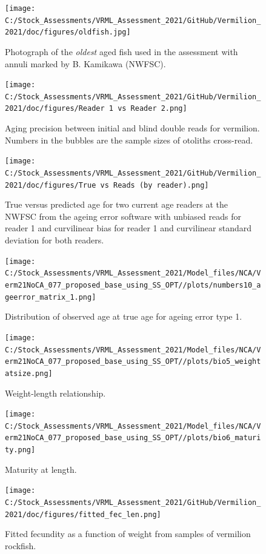\documentclass[
  english,
  a4paper,
]{article}
\begin{document}
\begin{figure}
\centering
\texttt{[image: C:/Stock\_Assessments/VRML\_Assessment\_2021/GitHub/Vermilion\_2021/doc/figures/oldfish.jpg]}
\caption{Photograph of the \emph{oldest} aged fish used in the assessment with annuli marked by B. Kamikawa (NWFSC).\label{fig:oldfish}}
\end{figure}

\begin{figure}
\centering
\texttt{[image: C:/Stock\_Assessments/VRML\_Assessment\_2021/GitHub/Vermilion\_2021/doc/figures/Reader 1 vs Reader 2.png]}
\caption{Aging precision between initial and blind double reads for vermilion.
Numbers in the bubbles are the sample sizes of otoliths cross-read.\label{fig:reader1reader2}}
\end{figure}

\begin{figure}
\centering
\texttt{[image: C:/Stock\_Assessments/VRML\_Assessment\_2021/GitHub/Vermilion\_2021/doc/figures/True vs Reads (by reader).png]}
\caption{True versus predicted age for two current age readers at the NWFSC
from the ageing error software with unbiased reads for reader 1 and curvilinear
bias for reader 1 and curvilinear standard deviation for both readers.\label{fig:truereads}}
\end{figure}

\begin{figure}
\centering
\texttt{[image: C:/Stock\_Assessments/VRML\_Assessment\_2021/Model\_files/NCA/Verm21NoCA\_077\_proposed\_base\_using\_SS\_OPT//plots/numbers10\_ageerror\_matrix\_1.png]}
\caption{Distribution of observed age at true age for ageing error type 1.\label{fig:ageerror}}
\end{figure}

\begin{figure}
\centering
\texttt{[image: C:/Stock\_Assessments/VRML\_Assessment\_2021/Model\_files/NCA/Verm21NoCA\_077\_proposed\_base\_using\_SS\_OPT//plots/bio5\_weightatsize.png]}
\caption{Weight-length relationship.\label{fig:weightlength}}
\end{figure}

\begin{figure}
\centering
\texttt{[image: C:/Stock\_Assessments/VRML\_Assessment\_2021/Model\_files/NCA/Verm21NoCA\_077\_proposed\_base\_using\_SS\_OPT//plots/bio6\_maturity.png]}
\caption{Maturity at length.\label{fig:maturity}}
\end{figure}

\begin{figure}
\centering
\texttt{[image: C:/Stock\_Assessments/VRML\_Assessment\_2021/GitHub/Vermilion\_2021/doc/figures/fitted\_fec\_len.png]}
\caption{Fitted fecundity as a function of weight from samples of vermilion rockfish.\label{fig:fitted-fecundity}}
\end{figure}
\end{document}
